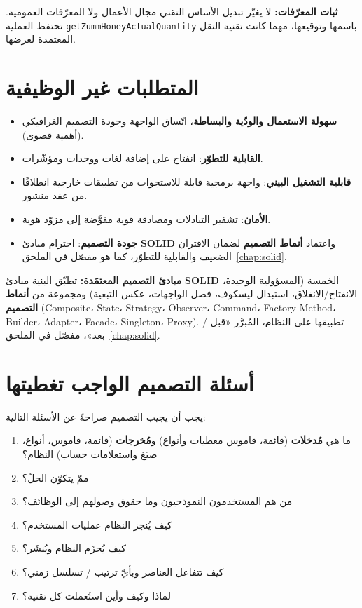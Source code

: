 \begin{encadre}
\textbf{ثبات المعرّفات:} لا يغيّر تبديل الأساس التقني مجال الأعمال ولا المعرّفات
العمومية. تحتفظ العملية \texttt{getZummHoneyActualQuantity} باسمها وتوقيعها،
مهما كانت تقنية النقل المعتمدة لعرضها.
\end{encadre}

\section{المتطلبات غير الوظيفية}
\begin{itemize}
  \item \textbf{سهولة الاستعمال والودّية والبساطة}، اتّساق الواجهة وجودة التصميم الغرافيكي (أهمية قصوى).
  \item \textbf{القابلية للتطوّر}: انفتاح على إضافة لغات ووحدات ومؤشّرات.
  \item \textbf{قابلية التشغيل البيني}: واجهة برمجية قابلة للاستجواب من تطبيقات خارجية انطلاقًا من عقد منشور.
  \item \textbf{الأمان}: تشفير التبادلات ومصادقة قوية مفوَّضة إلى مزوّد هوية.
  \item \textbf{جودة التصميم}: احترام مبادئ \textbf{SOLID} واعتماد \textbf{أنماط التصميم} لضمان الاقتران الضعيف والقابلية للتطوّر، كما هو مفصّل في الملحق~\ref{chap:solid}.
\end{itemize}

\begin{encadre}
\textbf{مبادئ التصميم المعتمَدة:} تطبّق البنية مبادئ \textbf{SOLID} الخمسة
(المسؤولية الوحيدة، الانفتاح/الانغلاق، استبدال ليسكوف، فصل الواجهات، عكس
التبعية) ومجموعة من \textbf{أنماط التصميم} (Composite، State، Strategy،
Observer، Command، Factory Method، Builder، Adapter، Facade، Singleton، Proxy).
تطبيقها على النظام، المُبرَّر «قبل / بعد»، مفصّل في الملحق~\ref{chap:solid}.
\end{encadre}

\section{أسئلة التصميم الواجب تغطيتها}
يجب أن يجيب التصميم صراحةً عن الأسئلة التالية:
\begin{enumerate}
  \item ما هي \textbf{مُدخلات} (قائمة، قاموس معطيات وأنواع) و\textbf{مُخرجات} (قائمة، قاموس، أنواع، صيَغ واستعلامات حساب) النظام؟
  \item ممّ يتكوّن الحلّ؟
  \item من هم المستخدمون النموذجيون وما حقوق وصولهم إلى الوظائف؟
  \item كيف يُنجز النظام عمليات المستخدم؟
  \item كيف يُحزَم النظام ويُنشَر؟
  \item كيف تتفاعل العناصر وبأيّ ترتيب / تسلسل زمني؟
  \item لماذا وكيف وأين استُعملت كل تقنية؟
\end{enumerate}

